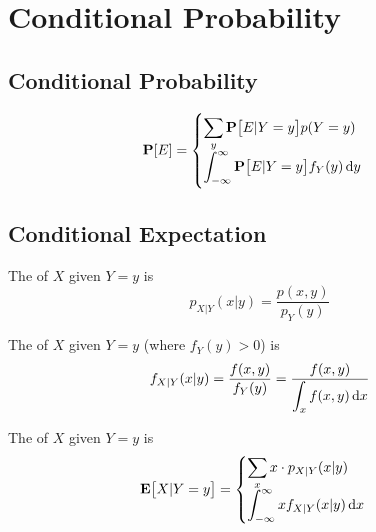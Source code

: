 \chapter{Conditional Probability}

\section{Conditional Probability}

\begin{theorem}
    \begin{equation}
        \probability{E} = \begin{cases}
            \displaystyle \sum_y \probability{E|Y = y} p(Y=y) \\
            \displaystyle \int_{-\infty}^\infty \probability{E|Y=y} f_Y(y) \dif{y}
        \end{cases}
    \end{equation}    
\end{theorem}


\section{Conditional Expectation}

\begin{definition}
    The  of $X$ given $Y=y$ is 
    \begin{equation}
        p_{X|Y}(x|y) = \dfrac{p(x,y)}{p_Y (y)}
    \end{equation}
    
    The  of $X$ given $Y=y$ (where $f_Y (y) > 0$) is 
    \begin{equation}
        f_{X|Y}(x|y) = \dfrac{f(x,y)}{f_Y (y)} = \dfrac{f(x,y)}{\displaystyle \int_x f(x,y) \dif{x}}
    \end{equation}
\end{definition}





\begin{definition}
    The  of $X$ given $Y=y$ is 
    \begin{equation}
        \displaystyle \expect{X|Y=y} = \begin{cases}
            \displaystyle \sum_x x \cdot p_{X|Y}(x|y) \\
            \displaystyle \int_{-\infty}^\infty x f_{X|Y} (x|y) \dif{x}
        \end{cases} 
    \end{equation}
\end{definition}

